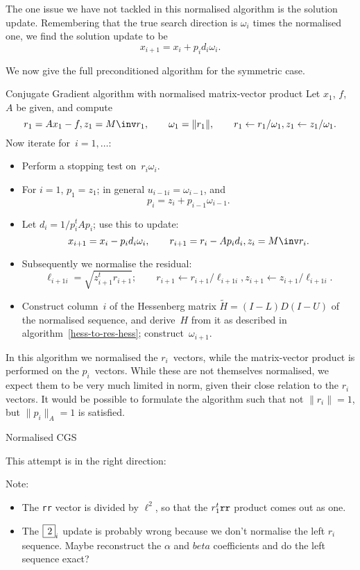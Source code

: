 \documentclass[11pt]{artikel3}
\begin{document}
\begin{Outline}
The one issue we have not tackled in this normalised algorithm
is the solution update. Remembering that the true search
direction is $\omega_i$ times the normalised one,
we find the solution update to be
\[ x_{i+1} = x_i+p_id_i\omega_i.\]

We now give the full preconditioned algorithm for the symmetric case.
\begin{algorithm}{Conjugate Gradient algorithm with normalised matrix-vector
product}
Let $x_1$, $f$, $A$ be given, and compute
\[ r_1 = Ax_1-f,z_1=M\inv r_1,\qquad \omega_1=\|r_1\|,
    \qquad r_1\leftarrow r_1/\omega_1,z_1\leftarrow z_1/\omega_1. \]
Now iterate for~$i=1,\ldots$:
\begin{itemize}
\item Perform a stopping test on~$r_i\omega_i$.
\item For $i=1$, $p_1=z_1$; in general $u_{i-1i}=\omega_{i-1}$, and
    \[ p_i=z_i+p_{i-1}\omega_{i-1}. \]
\item Let $d_i=1/p_i^tAp_i$; use this to update:
\[ x_{i+1} = x_i-p_id_i\omega_i,\qquad r_{i+1}=r_i-Ap_id_i,z_i=M\inv r_i. \]
\item Subsequently we normalise the residual:
\[ \ell_{i+1i} = \sqrt{z_{i+1}^tr_{i+1}};\qquad
     r_{i+1}\leftarrow r_{i+1}/\ell_{i+1i},
     z_{i+1}\leftarrow z_{i+1}/\ell_{i+1i}. \]
\item Construct column~$i$ of the Hessenberg matrix
$\tilde H=(I-L)D(I-U)$ of
the normalised sequence, and derive~$H$ from it as described in 
algorithm~\ref{hess-to-res-hess}; construct~$\omega_{i+1}$.
\end{itemize}
\end{algorithm}

In this algorithm we normalised the $r_i$~vectors, while the matrix-vector
product is performed on the $p_i$~vectors. While these are not themselves
normalised, we expect them to be very much limited in norm, given their
close relation to the $r_i$ vectors. It would be possible to formulate
the algorithm such that not $\|r_i\|=1$, but $\|p_i\|_A=1$ is satisfied.

 {Normalised CGS}

This attempt is in the right direction:

Note:
\begin{itemize}
\item The \verb+rr+ vector is divided by $\ell^2$, so that the $r_1^t\verb+rr+$
product comes out as one.
\item The $\fbox{$\,2$}_{i}$ update is probably wrong because we don't normalise
the left $r_i$ sequence. Maybe reconstruct the $\alpha$ and $beta$ 
coefficients and do the left sequence exact?
\end{itemize}


\end{Outline}
\end{document}
